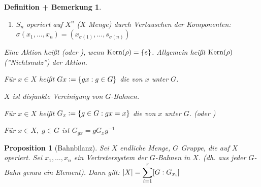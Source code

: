 \documentclass[a4paper,10pt,german]{scrbook}
\theoremstyle{saetze}
\theoremstyle{definitionen}
\newtheorem{DefBem}[Def]{Definition + Bemerkung}
\newtheorem{Prop}[Def]{Proposition}
\begin{document}
\begin{DefBem}
\begin{enum}
{\begin{enumerate}
                \item $S_n$ operiert auf $X^n$ ($X$ Menge) durch Vertauschen
                der Komponenten: $\sigma(x_1,\dots,x_n) = 
                (x_{\sigma(1)},\dots,s_{\sigma(n)})$
            \end{enumerate}
        }

        \item Eine Aktion heißt  (oder ), wenn 
        $\mathop{\rm Kern}\nolimits(\rho) = \{e\}$. \newline Allgemein heißt $\mathop{\rm Kern}\nolimits(\rho)$ 
         (''Nichtsnutz'') der Aktion.

\item Für $x \in X$ heißt $Gx \mathrel{\mathop:}= \{ gx : g \in G\}$ die 
von $x$ unter $G$.
\item $X$ ist disjunkte Vereinigung von $G$-Bahnen.

\item Für $x \in X$ heißt $G_x \mathrel{\mathop:}= \{ g \in G : gx = x\}$ die
 von $x$ unter $G$. (oder )
\item Für $x \in X,\; g \in G$ ist $G_{gx} = g G_{x} g^{-1}$

\end{enum}
\end{DefBem}


\begin{Prop}[Bahnbilanz]
\label{1.23}
    Sei $X$ endliche Menge, $G$ Gruppe, die auf $X$ operiert. Sei
    $x_1,\dots,x_n$ ein Vertretersystem der $G$-Bahnen in $X$. (dh. aus jeder
    $G$-Bahn genau ein Element). Dann gilt: \newline
    $\displaystyle |X| = \sum_{i=1}^r [G:G_{x_i}]$ \newline
\end{Prop}
\end{document}
